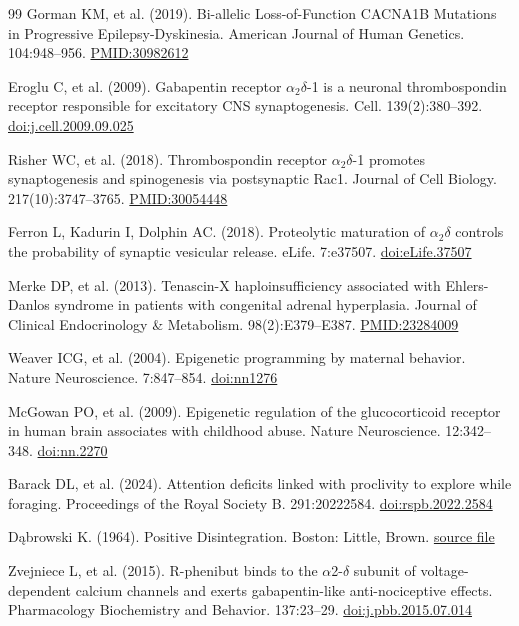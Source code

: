 \begin{thebibliography}{99}
 Gorman KM, et al. (2019). Bi-allelic Loss-of-Function CACNA1B Mutations in Progressive Epilepsy-Dyskinesia. American Journal of Human Genetics. 104:948–956. \href{https://pubmed.ncbi.nlm.nih.gov/30982612/}{PMID:30982612}

 Eroglu C, et al. (2009). Gabapentin receptor \ensuremath{\alpha_2\delta}-1 is a neuronal thrombospondin receptor responsible for excitatory CNS synaptogenesis. Cell. 139(2):380–392. \href{https://doi.org/10.1016/j.cell.2009.09.025}{doi:j.cell.2009.09.025}

 Risher WC, et al. (2018). Thrombospondin receptor \ensuremath{\alpha_2\delta}-1 promotes synaptogenesis and spinogenesis via postsynaptic Rac1. Journal of Cell Biology. 217(10):3747–3765. \href{https://pubmed.ncbi.nlm.nih.gov/30054448/}{PMID:30054448}

 Ferron L, Kadurin I, Dolphin AC. (2018). Proteolytic maturation of \ensuremath{\alpha_2\delta} controls the probability of synaptic vesicular release. eLife. 7:e37507. \href{https://doi.org/10.7554/eLife.37507}{doi:eLife.37507}

 Merke DP, et al. (2013). Tenascin-X haploinsufficiency associated with Ehlers-Danlos syndrome in patients with congenital adrenal hyperplasia. Journal of Clinical Endocrinology \& Metabolism. 98(2):E379–E387. \href{https://pubmed.ncbi.nlm.nih.gov/23284009/}{PMID:23284009}

 Weaver ICG, et al. (2004). Epigenetic programming by maternal behavior. Nature Neuroscience. 7:847–854. \href{https://doi.org/10.1038/nn1276}{doi:nn1276}

 McGowan PO, et al. (2009). Epigenetic regulation of the glucocorticoid receptor in human brain associates with childhood abuse. Nature Neuroscience. 12:342–348. \href{https://doi.org/10.1038/nn.2270}{doi:nn.2270}

 Barack DL, et al. (2024). Attention deficits linked with proclivity to explore while foraging. Proceedings of the Royal Society B. 291:20222584. \href{https://doi.org/10.1098/rspb.2022.2584}{doi:rspb.2022.2584}

 Dąbrowski K. (1964). Positive Disintegration. Boston: Little, Brown. \href{https://archive.org/details/positivedisinteg00dabr}{source file}

 Zvejniece L, et al. (2015). R-phenibut binds to the \ensuremath{\alpha}2-\ensuremath{\delta} subunit of voltage-dependent calcium channels and exerts gabapentin-like anti-nociceptive effects. Pharmacology Biochemistry and Behavior. 137:23–29. \href{https://doi.org/10.1016/j.pbb.2015.07.014}{doi:j.pbb.2015.07.014}


\end{thebibliography}
